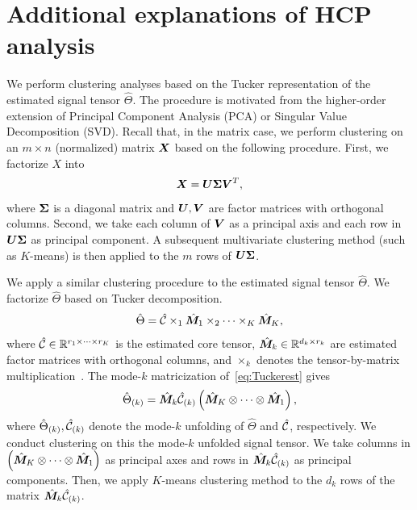 \documentclass{article}
\theoremstyle{plain}
\theoremstyle{definition}
\begin{document}
\section{Additional explanations of HCP analysis}\label{sec:additionalHCP}
We perform clustering analyses based on the Tucker representation of the estimated signal tensor $\hat\Theta$. The procedure is motivated from the higher-order extension of Principal Component Analysis (PCA) or Singular Value Decomposition (SVD). Recall that, in the matrix case, we perform clustering on an $m\times n$ (normalized) matrix $\bm X$ based on the following procedure. First, we factorize $X$ into
\begin{equation}
\bm X = \bm{U}\bm \Sigma \bm{V}^T,
\end{equation}
where $\bm \Sigma$ is a diagonal matrix and $\bm{U},\bm{V}$ are factor matrices with orthogonal columns. Second, we take each column of $\bm{V}$ as a principal axis and each row in $\bm{U}\bm \Sigma$ as principal component. A subsequent multivariate clustering method (such as $K$-means) is then applied to the $m$ rows of $\bm{U}\bm \Sigma$.


We apply a similar clustering procedure to the estimated signal tensor $\hat\Theta$. We factorize $\hat \Theta$ based on Tucker decomposition.
\begin{equation}\label{eq:Tuckerest}
\hat \Theta = \hat {\mathcal{C}}\times_1\hat {\bm M}_1\times_2\cdots\times_K\hat {\bm M}_K,
\end{equation}
where $\hat {\mathcal{C}}\in\mathbb{R}^{r_1\times \cdots \times r_K}$ is the estimated core tensor, $\hat {\bm M}_k\in\mathbb{R}^{d_k\times r_k}$ are estimated factor matrices with orthogonal columns, and $\times_k$ denotes the tensor-by-matrix multiplication~\citep{kolda2009tensor}. The mode-$k$ matricization of~\eqref{eq:Tuckerest} gives
\begin{equation}
\hat \Theta_{(k)} = \hat {\bm M}_k\hat {\mathcal{C}}_{(k)}\left(\hat {\bm M}_K\otimes\cdots\otimes\hat {\bm M}_1\right),
\end{equation}
where $\hat \Theta_{(k)} , \hat {\mathcal{C}}_{(k)}$ denote the mode-$k$ unfolding of $\hat \Theta$ and $\hat {\mathcal{C}}$, respectively. We conduct clustering on this  the mode-$k$ unfolded signal tensor. We take columns in $\left(\hat {\bm M}_K\otimes\cdots\otimes\hat {\bm M}_1\right)$ as principal axes and rows in $\hat {\bm M}_k\hat {\mathcal{C}}_{(k)}$ as principal components. Then, we apply $K$-means clustering method to the $d_k$ rows of the matrix $\hat {\bm M}_k\hat {\mathcal{C}}_{(k)}$.
\end{document}
